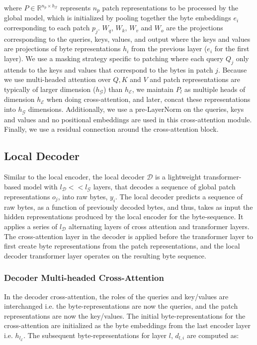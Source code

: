 where $P \in \mathbb{R}^{n_p \times h_{\mathcal{G}}}$ represents $n_p$ patch representations to be processed by the global model, which is initialized by pooling together the byte embeddings $e_i$ corresponding to each patch $p_j$. $W_q$, $W_k$, $W_v$ and $W_o$ are the projections corresponding to the queries, keys, values, and output where the keys and values are projections of byte representations $h_i$ from the previous layer ($e_i$ for the first layer). We use a masking strategy specific to patching where each query $Q_j$ only attends to the keys and values that correspond to the bytes in patch $j$. Because we use multi-headed attention over $Q, K$ and $V$ and patch representations are typically of larger dimension ($h_{\mathcal{G}}$) than $h_{\mathcal{E}}$, we maintain $P_l$ as multiple heads of dimension $h_{\mathcal{E}}$ when doing cross-attention, and later, concat these representations into $h_{\mathcal{G}}$ dimensions. Additionally, we use a pre-LayerNorm on the queries, keys and values and no positional embeddings are used in this cross-attention module. Finally, we use a residual connection around the cross-attention block. 

\subsection{Local Decoder} 

Similar to the local encoder, the local decoder  $\mathcal{D}$ is a lightweight transformer-based model with $l_{\mathcal{D}} << l_{\mathcal{G}}$ layers, that decodes a sequence of global patch representations $o_j$, into raw bytes, $y_i$. The local decoder predicts a sequence of raw bytes, as a function of previously decoded bytes, and thus, takes as input the hidden representations produced by the local encoder for the byte-sequence. It applies a series of $l_{\mathcal{D}}$ alternating layers of cross attention and transformer layers. The cross-attention layer in the decoder is applied before the transformer layer to first create byte representations from the patch representations, and the local decoder transformer layer operates on the resulting byte sequence. 

\subsubsection{Decoder Multi-headed Cross-Attention} 

In the decoder cross-attention, the roles of the queries and key/values are interchanged i.e. the byte-representations are now the queries, and the patch representations are now the key/values. The initial byte-representations for the cross-attention are initialized as the byte embeddings from the last encoder layer i.e. $h_{l_{\mathcal{E}}}$. The subsequent byte-representations for layer $l$, $d_{l,i}$ are computed as:

